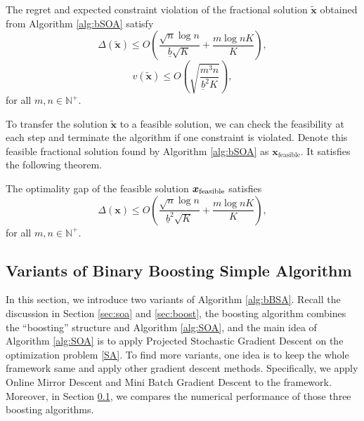 \documentclass{article} %
\begin{document}
\begin{theorem}
The regret and expected constraint violation of the fractional solution $\tilde{\bm{x}}$ obtained from Algorithm \ref{alg:bSOA} satisfy
$$\Delta(\tilde{\bm{x}}) \le O\left(\frac{\sqrt{n}\log n}{\underline{b}\sqrt{K}}  +\frac{m\log nK}{K}\right),$$
$$v(\tilde{\bm{x}}) \le O\left(\sqrt{\frac{m^3n}{\underline{b}^2K}}\right),$$
for all $m, n \in \mathbb{N}^+$.
\label{thm_BSA_cv}
\end{theorem}

To transfer the solution $\tilde{\bm{x}}$ to a feasible solution, we can check the feasibility at each step and terminate the algorithm if one constraint is violated. Denote this feasible fractional solution found by Algorithm \ref{alg:bSOA} as $\bm{x}_{\text{feasible}}$. It satisfies the following theorem. 

\begin{theorem}
The optimality gap of the feasible solution $\bm{x}_{\text{\rm{feasible}}}$ satisfies
$$\Delta({\bm{x}}) \le O\left(\frac{\sqrt{n}\log n}{\underline{b}^2\sqrt{K}}  +\frac{m\log nK}{K}\right),$$
for all $m, n \in \mathbb{N}^+$.
\label{thm_BSA}
\end{theorem}


\subsection{Variants of Binary Boosting Simple Algorithm}
\label{sec:gen}
In this section, we introduce two variants of Algorithm \ref{alg:bBSA}. Recall the discussion in Section \ref{sec:soa} and \ref{sec:boost}, the boosting algorithm combines the ``boosting'' structure and Algorithm \ref{alg:SOA}, and the main idea of Algorithm \ref{alg:SOA} is to apply Projected Stochastic Gradient Descent on the optimization problem \eqref{SA}. To find more variants, one idea is to keep the whole framework same and apply other gradient descent methods. Specifically, we apply Online Mirror Descent and Mini Batch Gradient Descent to the framework. Moreover, in Section \ref{sec:gen}, we compares the numerical performance of those three boosting algorithms. 
\end{document}

